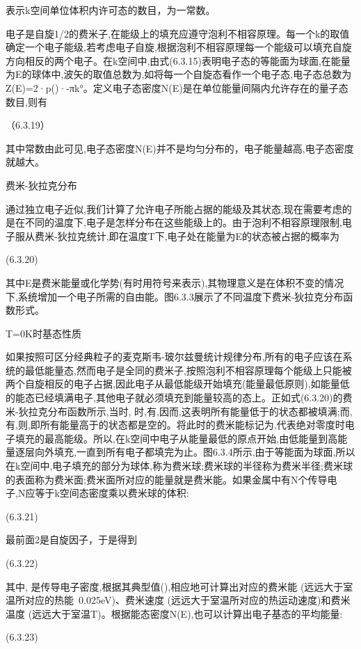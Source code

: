 表示k空间单位体积内许可态的数目，为一常数。

电子是自旋1/2的费米子,在能级上的填充应遵守泡利不相容原理。每一个k的取值确定一个电子能级,若考虑电子自旋,根据泡利不相容原理每一个能级可以填充自旋方向相反的两个电子。在k空间中,由式(6.3.15)表明电子态的等能面为球面,在能量为E的球体中,波矢的取值总数为,如将每一个自旋态看作一个电子态,电子态总数为Z(E)=2·p()·-πk°。定义电子态密度N(E)是在单位能量间隔内允许存在的量子态数目,则有

	（6.3.19）

其中常数由此可见,电子态密度N(E)并不是均匀分布的，电子能量越高,电子态密度就越大。

费米-狄拉克分布

通过独立电子近似,我们计算了允许电子所能占据的能级及其状态,现在需要考虑的是在不同的温度下,电子是怎样分布在这些能级上的。由于泡利不相容原理限制,电子服从费米-狄拉克统计,即在温度T下,电子处在能量为E的状态被占据的概率为

 	(6.3.20)

其中E是费米能量或化学势(有时用符号来表示),其物理意义是在体积不变的情况下,系统增加一个电子所需的自由能。图6.3.3展示了不同温度下费米-狄拉克分布函数形式。





T=0K时基态性质

如果按照可区分经典粒子的麦克斯韦-玻尔兹曼统计规律分布,所有的电子应该在系统的最低能量态,然而电子是全同的费米子,按照泡利不相容原理每个能级上只能被两个自旋相反的电子占据,因此电子从最低能级开始填充(能量最低原则),如能量低的能态已经填满电子,其他电子就必须填充到能量较高的态上。正如式(6.3.20)的费米-狄拉克分布函数所示,当时, 时,有,因而,这表明所有能量低于的状态都被填满;而,有,则,即所有能量高于的状态都是空的。将此时的费米能标记为,代表绝对零度时电子填充的最高能级。所以,在k空间中电子从能量最低的原点开始,由低能量到高能量逐层向外填充,一直到所有电子都填完为止。图6.3.4所示,由于等能面为球面,所以在k空间中,电子填充的部分为球体,称为费米球;费米球的半径称为费米半径;费米球的表面称为费米面;费米面所对应的能量就是费米能。如果金属中有N个传导电子,N应等于k空间态密度乘以费米球的体积:

 	(6.3.21)

最前面2是自旋因子，于是得到

 	(6.3.22)

其中, 是传导电子密度,根据其典型值(),相应地可计算出对应的费米能 (远远大于室温所对应的热能~0.025eV)、费米速度 (远远大于室温所对应的热运动速度)和费米温度 (远远大于室温T)。根据能态密度N(E),也可以计算出电子基态的平均能量:

 (6.3.23)

